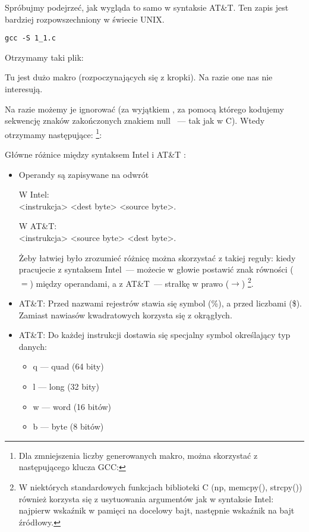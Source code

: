 Spróbujmy podejrzeć, jak wygląda to samo w syntaksie AT\&T.
Ten zapis jest bardziej rozpowszechniony w świecie UNIX.

\begin{lstlisting}[caption=kompilujemy w GCC 4.7.3]
gcc -S 1_1.c
\end{lstlisting}

Otrzymamy taki plik:



Tu jest dużo makro (rozpoczynających się z kropki). Na razie one nas nie interesują.

Na razie możemy je ignorować (za wyjątkiem , za pomocą którego kodujemy sekwencję znaków zakończonych znakiem null ~--- tak jak w C). Wtedy otrzymamy następujące:
\footnote{Dla zmniejszenia liczby generowanych  makro, można skorzystać z następującego klucza GCC: }:



\myindex{\ATTSyntax}
\myindex{\IntelSyntax}
Główne różnice między syntaksem Intel i AT\&T :

\begin{itemize}

\item
Operandy są zapisywane na odwrót

W Intel: \\
<instrukcja> <dest byte> <source byte>.

W AT\&T: \\
<instrukcja> <source byte> <dest byte>.

Żeby łatwiej było zrozumieć różnicę można skorzystać z takiej reguły:
kiedy pracujecie z syntaksem Intel~--- możecie w głowie postawić znak równości ($=$) między operandami,
a z AT\&T~--- strałkę w prawo ($\rightarrow$)
\footnote{W niektórych standardowych funkcjach biblioteki C (np, memcpy(), strcpy()) również korzysta się z usytuowania argumentów jak w syntaksie Intel: najpierw wskaźnik w pamięci na docelowy bajt, 
następnie wskaźnik na bajt źródłowy.}.

\item
AT\&T: Przed nazwami rejestrów stawia się symbol (\%), a przed liczbami (\$).
Zamiast nawiasów kwadratowych korzysta się z okrągłych.

\item
AT\&T: Do każdej instrukcji dostawia się specjalny symbol określający typ danych:

\begin{itemize}
\item q --- quad (64 bity)
\item l --- long (32 bity)
\item w --- word (16 bitów)
\item b --- byte (8 bitów)
\end{itemize}


\end{itemize}

